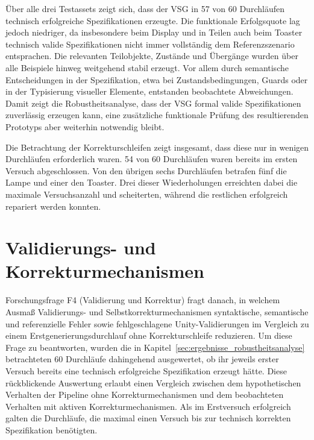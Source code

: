 Über alle drei Testassets zeigt sich, dass der VSG in 57 von 60 Durchläufen technisch erfolgreiche Spezifikationen erzeugte. Die funktionale Erfolgsquote lag jedoch niedriger, da insbesondere beim Display und in Teilen auch beim Toaster technisch valide Spezifikationen nicht immer vollständig dem Referenzszenario entsprachen. Die relevanten Teilobjekte, Zustände und Übergänge wurden über alle Beispiele hinweg weitgehend stabil erzeugt. Vor allem durch semantische Entscheidungen in der Spezifikation, etwa bei Zustandsbedingungen, Guards oder in der Typisierung visueller Elemente, entstanden beobachtete Abweichungen. Damit zeigt die Robustheitsanalyse, dass der VSG formal valide Spezifikationen zuverlässig erzeugen kann, eine zusätzliche funktionale Prüfung des resultierenden Prototyps aber weiterhin notwendig bleibt.

Die Betrachtung der Korrekturschleifen zeigt insgesamt, dass diese nur in wenigen Durchläufen erforderlich waren. 54 von 60 Durchläufen waren bereits im ersten Versuch abgeschlossen. Von den übrigen sechs Durchläufen betrafen fünf die Lampe und einer den Toaster. Drei dieser Wiederholungen erreichten dabei die maximale Versuchsanzahl und scheiterten, während die restlichen erfolgreich repariert werden konnten.

\section{Validierungs- und Korrekturmechanismen}\label{sec:validierung_korrekturzyklen}

Forschungsfrage F4 (Validierung und Korrektur) fragt danach, in welchem Ausmaß Validierungs- und Selbstkorrekturmechanismen syntaktische, semantische und referenzielle Fehler sowie fehlgeschlagene Unity-Validierungen im Vergleich zu einem Erstgenerierungsdurchlauf ohne Korrekturschleife reduzieren. Um diese Frage zu beantworten, wurden die in Kapitel~\ref{sec:ergebnisse_robustheitsanalyse} betrachteten 60 Durchläufe dahingehend ausgewertet, ob ihr jeweils erster Versuch bereits eine technisch erfolgreiche Spezifikation erzeugt hätte. Diese rückblickende Auswertung erlaubt einen Vergleich zwischen dem hypothetischen Verhalten der Pipeline ohne Korrekturmechanismen und dem beobachteten Verhalten mit aktiven Korrekturmechanismen. Als im Erstversuch erfolgreich galten die Durchläufe, die maximal einen Versuch bis zur technisch korrekten Spezifikation benötigten.

